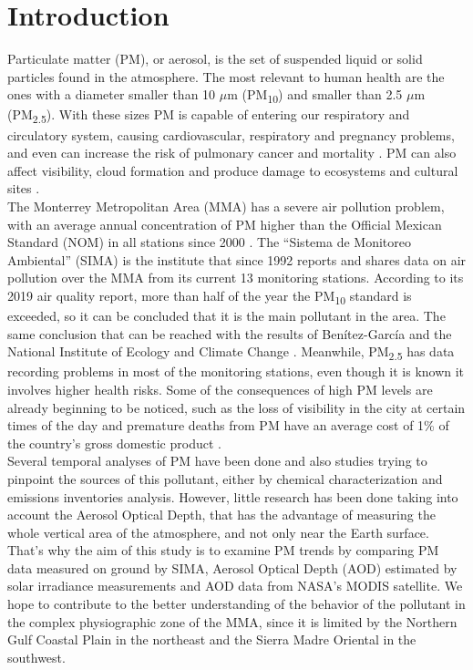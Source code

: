 \section{Introduction}
Particulate matter (PM), or aerosol, is the set of suspended liquid or solid particles found in the atmosphere.
The most relevant to human health are the ones with a diameter smaller than 10 $\mu$m (PM\textsubscript{10})
and smaller than 2.5 $\mu$m (PM\textsubscript{2.5}). With these sizes PM is capable of entering our respiratory
and circulatory system, causing cardiovascular, respiratory and pregnancy problems, and even can increase the
risk of pulmonary cancer and mortality \cite{Mukherjee2017}. PM can also affect visibility, cloud formation
and produce damage to ecosystems and cultural sites \cite{von2015}.\\

The Monterrey Metropolitan Area (MMA) has a severe air pollution problem, with an average annual concentration
of PM higher than the Official Mexican Standard (NOM) in all stations since 2000 \cite{martinez2016}.
The ``Sistema de Monitoreo Ambiental” (SIMA) is the institute that since 1992 reports and shares data on air
pollution over the MMA from its current 13 monitoring stations. According to its 2019 air quality report, more
than half of the year the PM\textsubscript{10} standard is exceeded, so it can be concluded that it is the
main pollutant in the area. The same conclusion that can be reached with the results of Benítez-García \cite{benitez2014} and the National
Institute of Ecology and Climate Change \cite{inecc2011,inecc2019}. Meanwhile, PM\textsubscript{2.5} has data recording problems in most
of the monitoring stations, even though it is known it involves higher health risks. Some of the consequences
of high PM levels are already beginning to be noticed, such as the loss of visibility in the city at certain
times of the day and premature deaths from PM have an average cost of 1\% of the country's gross domestic
product \cite{itdp2019}.\\

Several temporal analyses of PM have been done and also studies trying to pinpoint the sources of this pollutant,
either by chemical characterization and emissions inventories analysis. However, little research has been done
taking into account the Aerosol Optical Depth, that has the advantage of measuring the whole vertical area of
the atmosphere, and not only near the Earth surface. That’s why the aim of this study is to examine PM trends
by comparing PM data measured on ground by SIMA, Aerosol Optical Depth (AOD) estimated by solar irradiance
measurements and AOD data from NASA’s MODIS satellite. We hope to contribute to the better understanding of
the behavior of the pollutant in the complex physiographic zone of the MMA, since it is limited by the Northern
Gulf Coastal Plain in the northeast and the Sierra Madre Oriental in the southwest.\\

